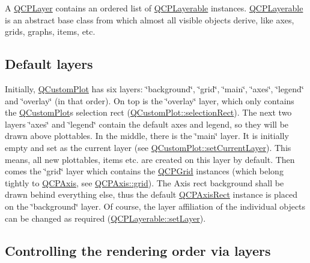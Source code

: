 A \mbox{\hyperlink{class_q_c_p_layer}{Q\+C\+P\+Layer}} contains an ordered list of \mbox{\hyperlink{class_q_c_p_layerable}{Q\+C\+P\+Layerable}} instances. \mbox{\hyperlink{class_q_c_p_layerable}{Q\+C\+P\+Layerable}} is an abstract base class from which almost all visible objects derive, like axes, grids, graphs, items, etc.\hypertarget{class_q_c_p_layer_qcplayer-defaultlayers}{}\subsection{Default layers}\label{class_q_c_p_layer_qcplayer-defaultlayers}
Initially, \mbox{\hyperlink{class_q_custom_plot}{Q\+Custom\+Plot}} has six layers\+: \char`\"{}background\char`\"{}, \char`\"{}grid\char`\"{}, \char`\"{}main\char`\"{}, \char`\"{}axes\char`\"{}, \char`\"{}legend\char`\"{} and \char`\"{}overlay\char`\"{} (in that order). On top is the \char`\"{}overlay\char`\"{} layer, which only contains the \mbox{\hyperlink{class_q_custom_plot}{Q\+Custom\+Plot}}\textquotesingle{}s selection rect (\mbox{\hyperlink{class_q_custom_plot_ad7df2bcbba307e644db383b449e31efd}{Q\+Custom\+Plot\+::selection\+Rect}}). The next two layers \char`\"{}axes\char`\"{} and \char`\"{}legend\char`\"{} contain the default axes and legend, so they will be drawn above plottables. In the middle, there is the \char`\"{}main\char`\"{} layer. It is initially empty and set as the current layer (see \mbox{\hyperlink{class_q_custom_plot_a73a6dc47c653bb6f8f030abca5a11852}{Q\+Custom\+Plot\+::set\+Current\+Layer}}). This means, all new plottables, items etc. are created on this layer by default. Then comes the \char`\"{}grid\char`\"{} layer which contains the \mbox{\hyperlink{class_q_c_p_grid}{Q\+C\+P\+Grid}} instances (which belong tightly to \mbox{\hyperlink{class_q_c_p_axis}{Q\+C\+P\+Axis}}, see \mbox{\hyperlink{class_q_c_p_axis_a63f1dd2df663680d2a8d06c19592dd63}{Q\+C\+P\+Axis\+::grid}}). The Axis rect background shall be drawn behind everything else, thus the default \mbox{\hyperlink{class_q_c_p_axis_rect}{Q\+C\+P\+Axis\+Rect}} instance is placed on the \char`\"{}background\char`\"{} layer. Of course, the layer affiliation of the individual objects can be changed as required (\mbox{\hyperlink{class_q_c_p_layerable_ab0d0da6d2de45a118886d2c8e16d5a54}{Q\+C\+P\+Layerable\+::set\+Layer}}).\hypertarget{class_q_c_p_layer_qcplayer-ordering}{}\subsection{Controlling the rendering order via layers}\label{class_q_c_p_layer_qcplayer-ordering}
